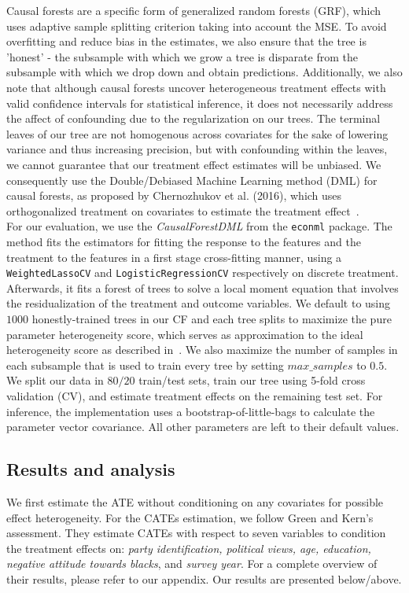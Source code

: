 \documentclass[12pt]{article}
\begin{document}
Causal forests are a specific form of generalized random forests (GRF), which
uses adaptive sample splitting criterion taking into account the MSE. To avoid
overfitting and reduce bias in the estimates, we also ensure that the tree is
'honest' - the subsample with which we grow a tree is disparate from the
subsample with which we drop down and obtain predictions. Additionally, we also
note that although causal forests uncover heterogeneous treatment effects with
valid confidence intervals for statistical inference, it does not necessarily
address the affect of confounding due to the regularization on our trees. The
terminal leaves of our tree are not homogenous across covariates for the sake of
lowering variance and thus increasing precision, but with confounding within the
leaves, we cannot guarantee that our treatment effect estimates will be
unbiased. We consequently use the Double/Debiased Machine Learning method (DML) for
causal forests, as proposed by Chernozhukov et al. (2016), which uses orthogonalized
treatment on covariates to estimate the treatment effect~\cite{DML}. 
\\

For our evaluation, we use the \textit{CausalForestDML} from the \texttt{econml}
package. The method fits the estimators for fitting the response to the features
and the treatment to the features in a first stage cross-fitting manner, using a
\texttt{WeightedLassoCV} and \texttt{LogisticRegressionCV} respectively on
discrete treatment. Afterwards, it fits a forest of trees to solve a local
moment equation that involves the residualization of the treatment and outcome
variables. We default to using $1000$ honestly-trained trees in our CF and each
tree splits to maximize the pure parameter heterogeneity score, which serves as
approximation to the ideal heterogeneity score as described
in~\cite{athey2018grf}. We also maximize the number of samples in each subsample
that is used to train every tree by setting $max\_samples$ to $0.5$. We split
our data in $80/20$ train/test sets, train our tree using 5-fold cross
validation (CV), and estimate treatment effects on the remaining test set. For
inference, the implementation uses a bootstrap-of-little-bags to calculate the
parameter vector covariance. All other parameters are left to their default
values. 

\subsection{Results and analysis}
We first estimate the ATE without conditioning on any covariates for possible
effect heterogeneity. For the CATEs estimation, we follow Green and Kern's assessment. They estimate
CATEs with respect to seven variables to condition the treatment effects on:
\textit{party identification, political views, age, education, negative attitude
towards blacks}, and \textit{survey year}. For a complete overview of their
results, please refer to our appendix. Our results are presented below/above.
\end{document}
